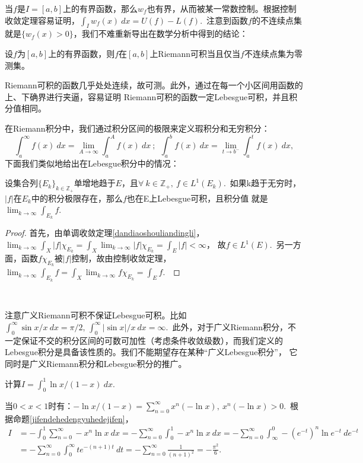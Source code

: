 \documentclass[color=green,thmcnt=section,lang=cn,12pt]{elegantbook}
\numberwithin{equation}{section}%
\numberwithin{figure}{section}%
\newcommand{\ZZ}{\mathbb{Z}}
\newcommand{\any}{\forall \ }
\newcommand{\csf}[1]{\{#1_k\}_{k\in \ZZ_+}} %
\begin{document}
当$f$是$I=[a,b]$上的有界函数，那么$w_f$也有界，从而被某一常数控制。根据控制收敛定理容易证明，$\int_Iw_f(x)\ dx=U(f)-L(f)$.\ 
注意到函数$f$的不连续点集就是$\{w_f(x)>0\}$，我们不难重新导出在数学分析中得到的结论：
\begin{theorem}
    设$f$为$[a,b]$上的有界函数，则$f$在$[a,b]$上Riemann可积当且仅当$f$不连续点集为零测集。
\end{theorem}

Riemann可积的函数几乎处处连续，故可测。此外，通过在每一个小区间用函数的上、下确界进行夹逼，容易证明
Riemann可积的函数一定Lebesgue可积，并且积分值相同。


在Riemann积分中，我们通过积分区间的极限来定义瑕积分和无穷积分：
\begin{equation*}
    \int_{a}^{\infty}f(x)\ dx=\lim_{A\to\infty}\int_{a}^{A}f(x)\ dx\ ;\ \  \int_{a}^{b}f(x)\ dx=\lim_{t\to b^-}\int_{a}^{t}f(x)\ dx,
\end{equation*}
下面我们类似地给出在Lebesgue积分中的情况：
\begin{proposition}
    设集合列$\csf{E}$单增地趋于$E$，且$\any k\in\ZZ_+,\ f\in L^1(E_k)$.\ 如果k趋于无穷时，$|f|$在$E_k$中的积分极限存在，那么$f$也在E上Lebesgue可积，且积分值
    就是$\lim_{k\to\infty}\int_{E_k}f$.\ 
\end{proposition}
\begin{proof}
    首先，由单调收敛定理\ref{dandiaoshouliandingli}，$\lim_{k\to\infty}\int_X|f|\chi_{E_k}=\int_X\lim_{k\to\infty}|f|\chi_{E_k}=\int_E|f|<\infty$，
    故$f\in L^1(E)$.\ 另一方面，函数$f\chi_{E_k}$被$|f|$控制，故由控制收敛定理，$\lim_{k\to\infty}\int_{E_k}f=\int_{X}\lim_{k\to\infty}f\chi_{E_k}=\int_Ef$.\ 
\end{proof}
\ 


注意广义Riemann可积不保证Lebesgue可积。比如$\int_{0}^{\infty}\sin x/x\ dx=\pi/2,\,\int_{0}^{\infty}|\sin x|/x\ dx=\infty$.\ 
此外，对于广义Riemann积分，不一定保证不交的积分区间的可数可加性（考虑条件收敛级数），而我们定义的Lebesgue积分是具备该性质的。我们不能期望存在某种``广义Lebesgue积分''，
它同时是广义Riemann积分和Lebesgue积分的推广。\\
\begin{example}
    计算$I=\int_{0}^{1}\ln x/(1-x)\ dx$.
\end{example}
\begin{solution}
    当$0<x<1$时有：$-\ln x/(1-x)=\sum_{n=0}^{\infty}x^n(-\ln x),\ x^n(-\ln x)>0$.\ 根据命题\ref{jifendehedengyuhedejifen}，
   \begin{equation*}
    \begin{aligned}
        I&=-\int_{0}^{1}\sum_{n=0}^{\infty}-x^n\ln x \ dx=-\sum_{n=0}^{\infty}\int_{0}^{1}-x^n\ln x \ dx=-\sum_{n=0}^{\infty}\int_{\infty}^{0}-(e^{-t})^n\ln e^{-t} \ de^{-t}&\\
        &=-\sum_{n=0}^{\infty}\int_{0}^{\infty}te^{-(n+1)t} \ dt=-\sum_{n=0}^{\infty}\frac{1}{(n+1)^2}=-\frac{\pi^2}{6}.\ 
    \end{aligned}    
   \end{equation*}
\end{solution}
\,
\end{document}
